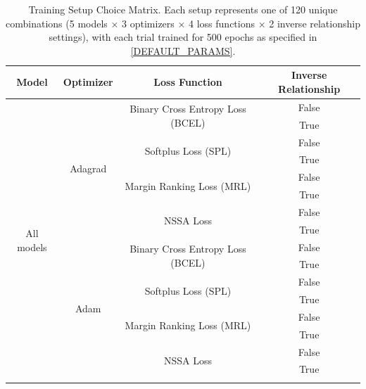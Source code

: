 \begin{table}[t]
  \centering
  \caption{Training Setup Choice Matrix. Each setup represents one of 120 unique combinations (5 models × 3 optimizers × 4 loss functions × 2 inverse relationship settings), with each trial trained for 500 epochs as specified in \autoref{DEFAULT_PARAMS}.}
  \label{tab:training_setup_choice_matrix}
  \begin{tabular}{|c|c|c|c|}
    \hline
    \textbf{Model} & \textbf{Optimizer} & \textbf{Loss Function} & \textbf{Inverse Relationship} \bigstrut \\ \hline
    \multirow{20}{*}{All models} 
    & \multirow{8}{*}{Adagrad} 
      & \multirow{2}{*}{Binary Cross Entropy Loss (BCEL)} & False \\ \cline{4-4}
    &   &                                               & True  \\ \cline{3-4}
    &   & \multirow{2}{*}{Softplus Loss (SPL)}           & False \\ \cline{4-4}
    &   &                                               & True  \\ \cline{3-4}
    &   & \multirow{2}{*}{Margin Ranking Loss (MRL)}      & False \\ \cline{4-4}
    &   &                                               & True  \\ \cline{3-4}
    &   & \multirow{2}{*}{NSSA Loss}                      & False \\ \cline{4-4}
    &   &                                               & True  \\ \cline{2-4}
    & \multirow{8}{*}{Adam} 
      & \multirow{2}{*}{Binary Cross Entropy Loss (BCEL)} & False \\ \cline{4-4}
    &   &                                               & True  \\ \cline{3-4}
    &   & \multirow{2}{*}{Softplus Loss (SPL)}           & False \\ \cline{4-4}
    &   &                                               & True  \\ \cline{3-4}
    &   & \multirow{2}{*}{Margin Ranking Loss (MRL)}      & False \\ \cline{4-4}
    &   &                                               & True  \\ \cline{3-4}
    &   & \multirow{2}{*}{NSSA Loss}                      & False \\ \cline{4-4}
    &   &                                               & True  \\ \cline{2-4}

\end{tabular}
\end{table}
